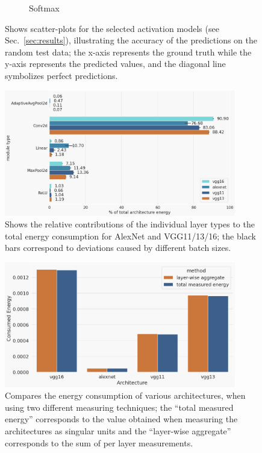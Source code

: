 \begin{figure}[h]
\begin{subfigure}[b]{0.47\textwidth}
            \caption[]%
            {{\small Softmax}}    
            \label{fig:layer-scatterplots softmax}
        \end{subfigure}
        \caption[Shows scatter-plots for the selected activation models (see Sec.~\ref{sec:results}), illustrating the accuracy of the predictions on the random test data; the x-axis represents the ground truth while the y-axis represents the predicted values, and the diagonal line symbolizes perfect predictions.]
        {Shows scatter-plots for the selected activation models (see Sec.~\ref{sec:results}), illustrating the accuracy of the predictions on the random test data; the x-axis represents the ground truth while the y-axis represents the predicted values, and the diagonal line symbolizes perfect predictions.}
        \label{fig:layer-scatterplots-activations}
\end{figure}
\begin{figure}[h]
    \centering
    \includegraphics[width=0.9\textwidth]{resources/module-wise-energies.png}
    \caption{Shows the relative contributions of the individual layer types to the total energy consumption for AlexNet and VGG11/13/16; the black bars correspond to deviations caused by different batch sizes.}
    \label{fig:layer-wise-contribution}
\end{figure}
\begin{figure}
    \centering
    \includegraphics[width=0.9\textwidth]{resources/agg-vs-measured-energy.png}
    \caption{Compares the energy consumption of various architectures, when using two different measuring techniques; the ``total measured energy'' corresponds to the value obtained when measuring the architectures as singular units and the ``layer-wise aggregate'' corresponds to the sum of per layer measurements.}
    \label{fig:agg-vs-total-energy}
\end{figure}
